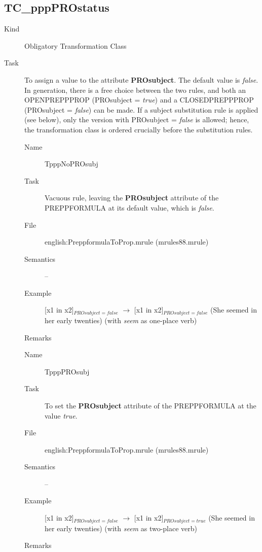 \subsection{TC\_pppPROstatus}
\begin{description}
\item[Kind] Obligatory Transformation Class
\item[Task] To assign a value to the attribute {\bf PROsubject}. The default 
value is {\em false\/}. In generation, there is a free choice between the two 
rules, and both an OPENPREPPPROP (PROsubject = {\em true\/}) and a 
CLOSEDPREPPPROP (PROsubject = {\em false\/}) can be made. If a subject 
substitution rule is applied (see below), only the version with PROsubject = {
\em false\/} is allowed; hence, the transformation class is ordered crucially 
before the substitution rules.

\vspace{1 cm}
\begin{description}
\item[Name] TpppNoPROsubj
\item[Task] Vacuous rule, leaving the {\bf PROsubject} attribute of the 
PREPPFORMULA at its default value, which is {\em false\/}.
\item[File] english:PreppformulaToProp.mrule (mrules88.mrule)
\item[Semantics] --
\item[Example] [x1 in x2]$_{PROsubject=false}$ $\rightarrow$ 
[x1 in x2]$_{PROsubject=false}$ (She seemed in her early 
twenties) (with {\em seem\/} as one-place verb)
\item[Remarks] 
\end{description}

\vspace{1 cm}
\begin{description}
\item[Name] TpppPROsubj
\item[Task] To set the {\bf PROsubject} attribute of the 
PREPPFORMULA at the value {\em true\/}.
\item[File] english:PreppformulaToProp.mrule (mrules88.mrule)
\item[Semantics] --
\item[Example] [x1 in x2]$_{PROsubject=false}$ $\rightarrow$ 
[x1 in x2]$_{PROsubject=true}$ (She seemed in her early 
twenties) (with {\em seem\/} as two-place verb)
\item[Remarks] 
\end{description}

\end{description}


